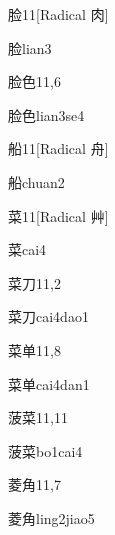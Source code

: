 \begin{entry}{脸}{11}[Radical 肉]
  \begin{phonetics}{脸}{lian3}
  \end{phonetics}
\end{entry}

\begin{entry}{脸色}{11,6}
  \begin{phonetics}{脸色}{lian3se4}
  \end{phonetics}
\end{entry}

\begin{entry}{船}{11}[Radical ⾈]
  \begin{phonetics}{船}{chuan2}
  \end{phonetics}
\end{entry}

\begin{entry}{菜}{11}[Radical 艸]
  \begin{phonetics}{菜}{cai4}
  \end{phonetics}
\end{entry}

\begin{entry}{菜刀}{11,2}
  \begin{phonetics}{菜刀}{cai4dao1}
  \end{phonetics}
\end{entry}

\begin{entry}{菜单}{11,8}
  \begin{phonetics}{菜单}{cai4dan1}
  \end{phonetics}
\end{entry}

\begin{entry}{菠菜}{11,11}
  \begin{phonetics}{菠菜}{bo1cai4}
  \end{phonetics}
\end{entry}

\begin{entry}{菱角}{11,7}
  \begin{phonetics}{菱角}{ling2jiao5}
  \end{phonetics}
\end{entry}

